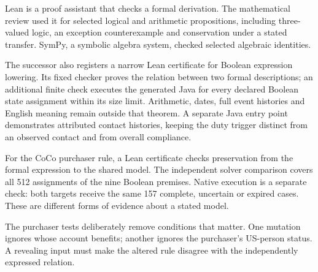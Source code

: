 \documentclass[12pt,a4paper,oneside,openany]{book}
\begin{document}
\clearpage
{}
Lean is a proof assistant that checks a formal derivation. The mathematical
review used it for selected logical and arithmetic propositions, including
three-valued logic, an exception counterexample and conservation under a stated
transfer. SymPy, a symbolic algebra system, checked selected algebraic identities.

\begin{MapDiagram}
\end{MapDiagram}

The successor also registers a narrow Lean certificate for Boolean expression
lowering. Its fixed checker proves the relation between two formal descriptions;
an additional finite check executes the generated Java for every declared
Boolean state assignment within its size limit. Arithmetic, dates, full event
histories and English meaning remain outside that theorem. A separate Java
entry point demonstrates attributed contact histories, keeping the duty trigger
distinct from an observed contact and from overall compliance.

For the CoCo purchaser rule, a Lean certificate checks preservation from the
formal expression to the shared model. The independent solver comparison covers
all 512 assignments of the nine Boolean premises. Native execution is a
separate check: both targets receive the same 157 complete, uncertain or
expired cases. These are different forms of evidence about a stated model.

The purchaser tests deliberately remove conditions that matter. One mutation
ignores whose account benefits; another ignores the purchaser's US-person
status. A revealing input must make the altered rule disagree with the
independently expressed relation.
\end{document}
